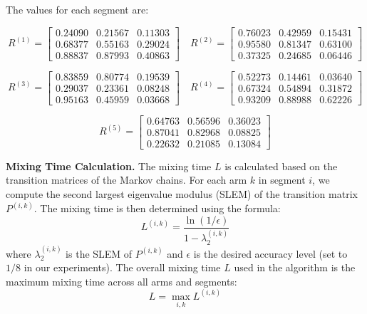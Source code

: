 \documentclass[twoside]{article}
\theoremstyle{plain}
\theoremstyle{definition}
\theoremstyle{remark}
\begin{document}
The values for each segment are:

\begin{equation}
R^{(1)} =
\begin{bmatrix}
0.24090 & 0.21567 & 0.11303 \\
0.68377 & 0.55163 & 0.29024 \\
0.88837 & 0.87993 & 0.40863
\end{bmatrix} \quad
R^{(2)} =
\begin{bmatrix}
0.76023 & 0.42959 & 0.15431 \\
0.95580 & 0.81347 & 0.63100 \\
0.37325 & 0.24685 & 0.06446
\end{bmatrix}
\end{equation}

\begin{equation}
R^{(3)} =
\begin{bmatrix}
0.83859 & 0.80774 & 0.19539 \\
0.29037 & 0.23361 & 0.08248 \\
0.95163 & 0.45959 & 0.03668
\end{bmatrix} \quad
R^{(4)} =
\begin{bmatrix}
0.52273 & 0.14461 & 0.03640 \\
0.67324 & 0.54894 & 0.31872 \\
0.93209 & 0.88988 & 0.62226
\end{bmatrix}
\end{equation}

\begin{equation}
R^{(5)} =
\begin{bmatrix}
0.64763 & 0.56596 & 0.36023 \\
0.87041 & 0.82968 & 0.08825 \\
0.22632 & 0.21085 & 0.13084
\end{bmatrix}
\end{equation}


\textbf{Mixing Time Calculation.} The mixing time $L$ is calculated based on the transition matrices of the Markov chains. For each arm $k$ in segment $i$, we compute the second largest eigenvalue modulus (SLEM) of the transition matrix $P^{(i,k)}$. The mixing time is then determined using the formula:
\begin{equation}
L^{(i,k)} = \frac{\ln(1/\epsilon)}{1 - \lambda_2^{(i,k)}}
\end{equation}
where $\lambda_2^{(i,k)}$ is the SLEM of $P^{(i,k)}$ and $\epsilon$ is the desired accuracy level (set to $1/8$ in our experiments). The overall mixing time $L$ used in the algorithm is the maximum mixing time across all arms and segments:
\begin{equation}
L = \max_{i,k} L^{(i,k)}
\end{equation}
\end{document}
